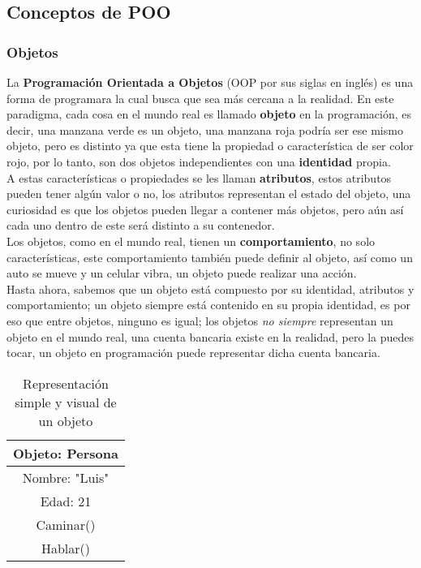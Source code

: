 \subsection{Conceptos de POO}

\subsubsection{Objetos}
La \textbf{Programación Orientada a Objetos} (OOP por sus siglas en inglés) es una forma de programara la cual busca que sea más cercana a la realidad. En este paradigma, cada cosa en el mundo real es llamado \textbf{objeto} en la programación, es decir, una manzana verde es un objeto, una manzana roja podría ser ese mismo objeto, pero es distinto ya que esta tiene la propiedad o característica de ser color rojo, por lo tanto, son dos objetos independientes con una \textbf{identidad} propia.\\
A estas características o propiedades se les llaman \textbf{atributos}, estos atributos pueden tener algún valor o  no, los atributos representan el estado del objeto, una curiosidad es que los objetos pueden llegar a contener más objetos, pero aún así cada uno dentro de este será distinto a su contenedor.\\
Los objetos, como en el mundo real, tienen un \textbf{comportamiento}, no solo características, este comportamiento también puede definir al objeto, así como un auto se mueve y un celular vibra, un objeto puede realizar una acción.\\
Hasta ahora, sabemos que un objeto está compuesto por su identidad, atributos y comportamiento; un objeto siempre está contenido en su propia identidad, es por eso que entre objetos, ninguno es igual; los objetos \textit{no siempre} representan un objeto en el mundo real, una cuenta bancaria existe en la realidad, pero la puedes tocar, un objeto en programación puede representar dicha cuenta bancaria.
\begin{table}[h]
    \begin{center}
        \caption{Representación simple y visual de un objeto}
        \label{tab: 7}
        \begin{tabular}{|c|}
            \hline
            Objeto: Persona \\ \hline
            Nombre: "Luis" \\
            Edad: 21 \\ \hline
            Caminar() \\
            Hablar()\\
            \hline
        \end{tabular}
    \end{center}
\end{table}

